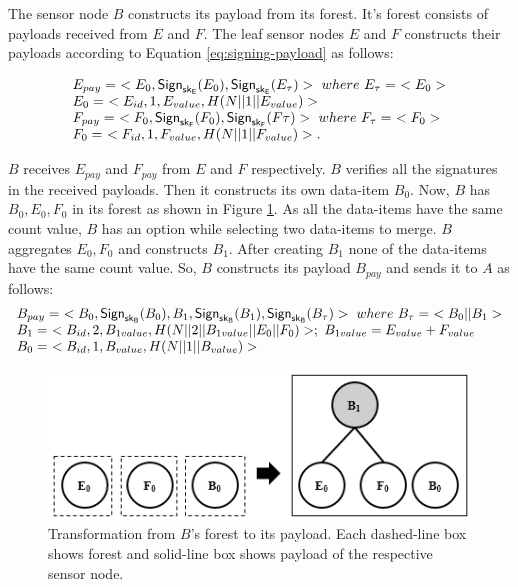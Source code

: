 	The sensor node $B$ constructs its payload from its forest. 
	It's forest consists of payloads received from $E$ and $F$.
	The leaf sensor nodes $E$ and $F$ constructs their payloads according to Equation \ref{eq:signing-payload} as follows:

	\begin{equation*}
		\begin{array}{l}
		E_{pay} =\ <E_{0}, \textsf{Sign}_{\sk_{E}}(E_{0}), \textsf{Sign}_{\sk_{E}}(E_{\tau}) >\ where\ E_{\tau} =\ <E_{0}>\\
		E_{0} =\ <E_{id}, 1, E_{value}, H(N||1||E_{value})>\\
		F_{pay} =\ <F_{0}, \textsf{Sign}_{\sk_{F}}(F_{0}), \textsf{Sign}_{\sk_{F}}(F{\tau}) >\ where\ F_{\tau} =\ <F_{0}>\\
		F_{0} =\ <F_{id}, 1, F_{value}, H(N||1||F_{value})>.
		\end{array}
	\end{equation*}
	
	$B$ receives $E_{pay}$ and $F_{pay}$ from $E$ and $F$ respectively. 
	$B$ verifies all the signatures in the received payloads.
	Then it constructs its own data-item $B_{0}$.
	Now, $B$ has $B_{0},E_{0},F_{0}$ in its forest as shown in Figure \ref{fig:b-forest-payload}. 
	As all the data-items have the same count value, $B$ has an option while selecting two data-items to merge.
	$B$ aggregates $E_{0},F_{0}$ and constructs $B_{1}$.
	After creating $B_{1}$ none of the data-items have the same count value. 
	So, $B$ constructs its payload $B_{pay}$ and sends it to $A$ as follows:
	\begin{equation*}
		\begin{array}{l}
			B_{pay} =\ < B_{0}, \textsf{Sign}_{\sf{sk}_{B}}(B_{0}), B_{1}, \textsf{Sign}_{\sf{sk}_{B}}(B_{1}), \textsf{Sign}_{\sf{sk}_{B}}(B_{\tau}) >\ where\ B_{\tau} =\ <B_{0} || B_{1}>\\
			B_{1} =\ < B_{id}, 2, B_{1value}, H(N||2||B_{1value}||E_{0}||F_{0})>;\ B_{1value} = E_{value} + F_{value} \\
			B_{0} =\ <B_{id}, 1, B_{value}, H(N||1||B_{value})>
		\end{array}
		\label{eq:b-payload}
	\end{equation*}

	\begin{figure}[h!]
		\centering
		\includegraphics{images/b-forest-payload.png}
		\caption{Transformation from $B$'s forest to its payload.
				Each dashed-line box shows forest and solid-line box shows payload of the respective sensor node.}
		\label{fig:b-forest-payload}
	\end{figure}

